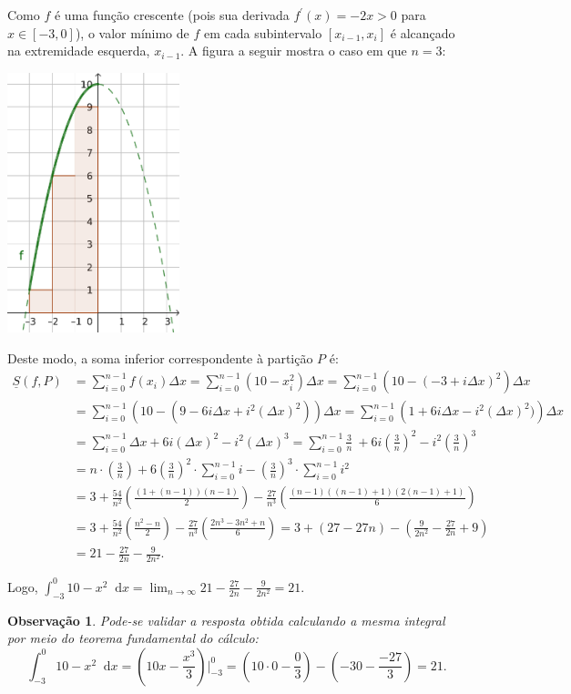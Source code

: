 \documentclass[12pt,a4paper]{article}
\newtheorem*{note}{Observação}
\newcommand*\diff{\mathop{}\!\mathrm{d}}
\begin{document}
\begin{ExerciseList}
Como $f$ é uma função crescente (pois sua derivada $f^\prime(x) = -2x > 0$ para $x \in [-3, 0]$), o valor mínimo de $f$ em cada subintervalo $[x_{i-1}, x_i]$ é alcançado na extremidade esquerda, $x_{i-1}$. A figura a seguir mostra o caso em que $n = 3$:
\begin{center}
\includegraphics[width=5.0cm]{img/soma-inferior.pdf}
\end{center}
Deste modo, a soma inferior correspondente à partição $P$ é:
\begin{align*}
  \underline{S}(f, P)
  & = \sum_{i=0}^{n-1} f(x_i) \Delta x
    = \sum_{i=0}^{n-1} \left(10-x_i^2\right) \Delta x
    = \sum_{i=0}^{n-1} \left(10-(-3 + i\Delta x)^2\right) \Delta x \\
  & = \sum_{i=0}^{n-1} \left(10-(9 - 6i\Delta x + i^2(\Delta x) ^2)\right) \Delta x
    = \sum_{i=0}^{n-1} \left(1 + 6i\Delta x - i^2(\Delta x) ^2)\right) \Delta x \\
  & = \sum_{i=0}^{n-1} \Delta x + 6i(\Delta x)^2 - i^2(\Delta x) ^3
    = \sum_{i=0}^{n-1} \frac{3}{n}\
    + 6i\left(\frac{3}{n}\right)^2
    - i^2\left(\frac{3}{n}\right)^3 \\
  & = n\cdot \left(\frac{3}{n}\right)
    + 6 \left(\frac{3}{n}\right)^2 \cdot \sum_{i=0}^{n-1} i
    - \left(\frac{3}{n}\right)^3 \cdot \sum_{i=0}^{n-1} i^2 \\
  & = 3
    + \frac{54}{n^2} \left(\frac{(1+(n-1))(n-1)}{2}\right)
    - \frac{27}{n^3}\left(\frac{(n-1)((n-1)+1)(2(n-1)+1)}{6}\right) \\
  & = 3
    + \frac{54}{n^2} \left(\frac{n^2 - n}{2}\right)
    - \frac{27}{n^3}\left(\frac{2 n^3 - 3 n^2 + n}{6}\right)
    = 3 + (27 - 27n)
    - \left(\frac{9}{2 n^2} - \frac{27}{2 n} + 9\right) \\
  & = 21 - \frac{27}{2 n} -\frac{9}{2 n^2}.
\end{align*}

Logo, $\int_{-3}^0 10-x^2\diff{x} = \lim_{n \to \infty} 21 - \frac{27}{2 n} -\frac{9}{2 n^2} = 21$.

\begin{note}
  Pode-se validar a resposta obtida calculando a mesma integral por meio do teorema fundamental do cálculo:
  \[
    \int_{-3}^0 10-x^2\diff{x}
    = \left(10x-\frac{x^3}{3}\right)\bigg\rvert_{-3}^0
    = \left(10 \cdot 0-\frac{0}{3}\right) - \left(-30 - \frac{-27}{3}\right)
    = 21.
  \]
\end{note}
\end{ExerciseList}
\end{document}
